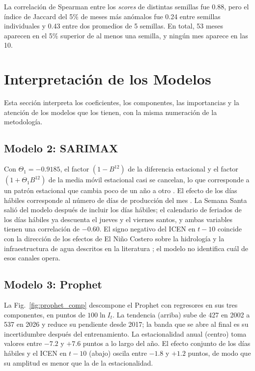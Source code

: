 \documentclass[conference]{IEEEtran}
\begin{document}
La correlación de Spearman entre los \textit{scores} de distintas semillas fue 0.88, pero el índice de Jaccard del 5\% de meses más anómalos fue 0.24 entre semillas individuales y 0.43 entre dos promedios de 5 semillas. En total, 53 meses aparecen en el 5\% superior de al menos una semilla, y ningún mes aparece en las 10.

\section{Interpretación de los Modelos}

Esta sección interpreta los coeficientes, los componentes, las importancias y la atención de los modelos que los tienen, con la misma numeración de la metodología.

\subsection{Modelo 2: SARIMAX}

Con $\Theta_1=-0.9185$, el factor $(1-B^{12})$ de la diferencia estacional y el factor $(1+\Theta_1 B^{12})$ de la media móvil estacional casi se cancelan, lo que corresponde a un patrón estacional que cambia poco de un año a otro \cite{box2015}. El efecto de los días hábiles corresponde al número de días de producción del mes \cite{bell1983}. La Semana Santa salió del modelo después de incluir los días hábiles; el calendario de feriados de los días hábiles ya descuenta el jueves y el viernes santos, y ambas variables tienen una correlación de $-0.60$. El signo negativo del ICEN en $t-10$ coincide con la dirección de los efectos de El Niño Costero sobre la hidrología y la infraestructura de agua descritos en la literatura \cite{lavado2013,takahashi2015,inei2017}; el modelo no identifica cuál de esos canales opera.

\subsection{Modelo 3: Prophet}

La Fig.~\ref{fig:prophet_comp} descompone el Prophet con regresores en sus tres componentes, en puntos de $100\ln I_t$. La tendencia (arriba) sube de 427 en 2002 a 537 en 2026 y reduce su pendiente desde 2017; la banda que se abre al final es su incertidumbre después del entrenamiento. La estacionalidad anual (centro) toma valores entre $-7.2$ y $+7.6$ puntos a lo largo del año. El efecto conjunto de los días hábiles y el ICEN en $t-10$ (abajo) oscila entre $-1.8$ y $+1.2$ puntos, de modo que su amplitud es menor que la de la estacionalidad.
\end{document}
